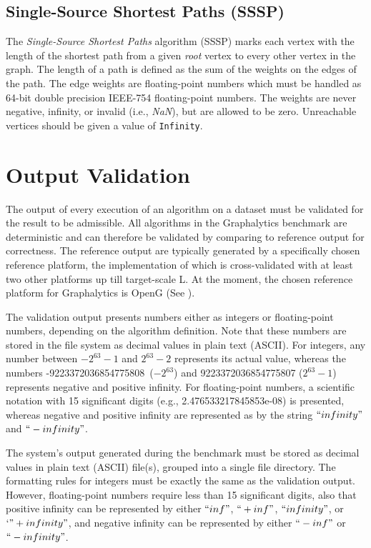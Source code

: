 \subsection{Single-Source Shortest Paths (SSSP)}
The \emph{Single-Source Shortest Paths} algorithm (SSSP) marks each vertex with the length of the shortest path from a given \emph{root} vertex to every other vertex in the graph. The length of a path is defined as the sum of the weights on the edges of the path. The edge weights are floating-point numbers which must be handled as 64-bit double precision IEEE-754 floating-point numbers. The weights are never negative, infinity, or invalid (i.e., \emph{NaN}), but are allowed to be zero. Unreachable vertices should be given a value of \verb=Infinity=.






\section{Output Validation}
\label{sec:definitions_validation}

The output of every execution of an algorithm on a dataset must be validated for the result to be admissible. All algorithms in the Graphalytics benchmark are deterministic and can therefore be validated by comparing to reference output for correctness. The reference output are typically generated by a specifically chosen reference platform, the implementation of which is cross-validated with at least two other platforms up till target-scale L. At the moment, the chosen reference platform for Graphalytics is OpenG (See ).

The validation output presents numbers either as integers or floating-point numbers, depending on the algorithm definition. Note that these numbers are stored in the file system as decimal values in plain text (ASCII). For integers, any number between $-2^{63}-1$ and $2^{63}-2$ represents its actual value, whereas the numbers \mbox{-9223372036854775808 ($-2^{63}$)} and \mbox{9223372036854775807} ($2^{63}-1$) represents negative and positive infinity. For floating-point numbers, a scientific notation with 15 significant digits (e.g., 2.476533217845853e-08) is presented, whereas negative and positive infinity are represented as by the string $``infinity"$ and $``-infinity"$.

The system's output generated during the benchmark must be stored as decimal values in plain text (ASCII) file(s), grouped into a single file directory. The formatting rules for integers must be exactly the same as the validation output. However, floating-point numbers require less than 15 significant digits, also that positive infinity can be represented by either $``inf"$, $``+inf"$, $``infinity"$, or $`"+infinity"$, and negative infinity can be represented by either $``-inf"$ or $``-infinity"$. 

